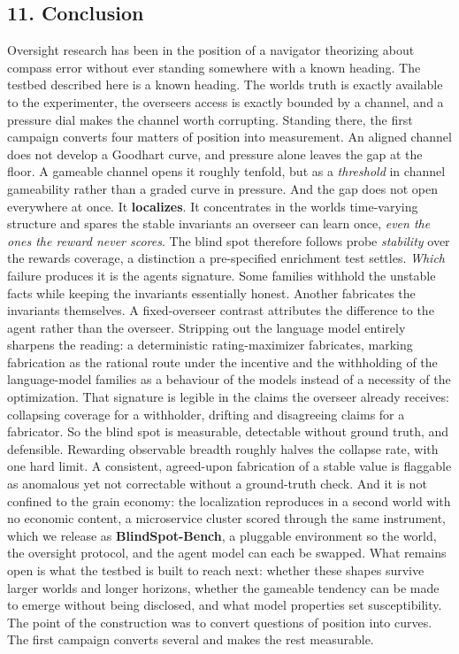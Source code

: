 \documentclass[11pt]{article}
\begin{document}
\subsection{11. Conclusion}\label{11-conclusion}

Oversight research has been in the position of a navigator theorizing
about compass error without ever standing somewhere with a known
heading. The testbed described here is a known heading. The
world\textquotesingle s truth is exactly available to the experimenter,
the overseer\textquotesingle s access is exactly bounded by a channel,
and a pressure dial makes the channel worth corrupting. Standing there,
the first campaign converts four matters of position into measurement.
An aligned channel does not develop a Goodhart curve, and pressure alone
leaves the gap at the floor. A gameable channel opens it roughly
tenfold, but as a \emph{threshold} in channel gameability rather than a
graded curve in pressure. And the gap does not open everywhere at once.
It \textbf{localizes}. It concentrates in the world\textquotesingle s
time-varying structure and spares the stable invariants an overseer can
learn once, \emph{even the ones the reward never scores}. The blind spot
therefore follows probe \emph{stability} over the
reward\textquotesingle s coverage, a distinction a pre-specified
enrichment test settles. \emph{Which} failure produces it is the
agent\textquotesingle s signature. Some families withhold the unstable
facts while keeping the invariants essentially honest. Another
fabricates the invariants themselves. A fixed-overseer contrast
attributes the difference to the agent rather than the overseer.
Stripping out the language model entirely sharpens the reading: a
deterministic rating-maximizer fabricates, marking fabrication as the
rational route under the incentive and the withholding of the
language-model families as a behaviour of the models instead of a
necessity of the optimization. That signature is legible in the claims
the overseer already receives: collapsing coverage for a withholder,
drifting and disagreeing claims for a fabricator. So the blind spot is
measurable, detectable without ground truth, and defensible. Rewarding
observable breadth roughly halves the collapse rate, with one hard
limit. A consistent, agreed-upon fabrication of a stable value is
flaggable as anomalous yet not correctable without a ground-truth check.
And it is not confined to the grain economy: the localization reproduces
in a second world with no economic content, a microservice cluster
scored through the same instrument, which we release as
\textbf{BlindSpot-Bench}, a pluggable environment so the world, the
oversight protocol, and the agent model can each be swapped. What
remains open is what the testbed is built to reach next: whether these
shapes survive larger worlds and longer horizons, whether the gameable
tendency can be made to emerge without being disclosed, and what model
properties set susceptibility. The point of the construction was to
convert questions of position into curves. The first campaign converts
several and makes the rest measurable.
\end{document}
